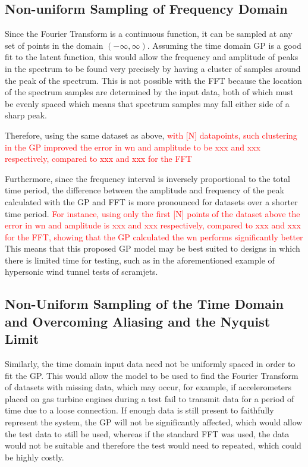 \documentclass[12pt]{article}
\begin{document}
    \subsection{Non-uniform Sampling of Frequency Domain}
    Since the Fourier Transform is a continuous function, it can be sampled at any set of points in the domain $(-\infty, \infty)$.
    Assuming the time domain GP is a good fit to the latent function, this would allow the frequency and amplitude of peaks in the spectrum to be found very precisely by having a cluster of samples around the peak of the spectrum.
    This is not possible with the FFT because the location of the spectrum samples are determined by the input data, both of which must be evenly spaced which means that spectrum samples may fall either side of a sharp peak.

    Therefore, using the same dataset as above, \textcolor{red}{ with [N] datapoints, such clustering in the GP improved the error in wn and amplitude to be xxx and xxx respectively, compared to xxx and xxx for the FFT}

    Furthermore, since the frequency interval is inversely proportional to the total time period, the difference between the amplitude and frequency of the peak calculated with the GP and FFT is more pronounced for datasets over a shorter time period.
    \textcolor{red}{For instance, using only the first [N] points of the dataset above the error in wn and amplitude is xxx and xxx respectively, compared to xxx and xxx for the FFT, showing that the GP calculated the wn performs significantly better}
    This means that this proposed GP model may be best suited to designs in which there is limited time for testing, such as in the aforementioned example of hypersonic wind tunnel tests of scramjets.

    \subsection{Non-Uniform Sampling of the Time Domain and Overcoming Aliasing and the Nyquist Limit}
    Similarly, the time domain input data need not be uniformly spaced in order to fit the GP.
    This would allow the model to be used to find the Fourier Transform of datasets with missing data, which may occur, for example, if accelerometers placed on gas turbine engines during a test fail to transmit data for a period of time due to a loose connection.
    If enough data is still present to faithfully represent the system, the GP will not be significantly affected, which would allow the test data to still be used, whereas if the standard FFT was used, the data would not be suitable and therefore the test would need to repeated, which could be highly costly.
\end{document}
